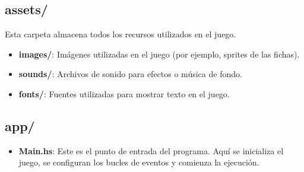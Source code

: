 \documentclass{article}
\begin{document}
\subsection{assets/}
Esta carpeta almacena todos los recursos utilizados en el juego.
\begin{itemize}
    \item \textbf{images/}: Imágenes utilizadas en el juego (por ejemplo, sprites de las fichas).
    \item \textbf{sounds/}: Archivos de sonido para efectos o música de fondo.
    \item \textbf{fonts/}: Fuentes utilizadas para mostrar texto en el juego.
\end{itemize}

\subsection{app/}
\begin{itemize}
    \item \textbf{Main.hs}: Este es el punto de entrada del programa. Aquí se inicializa el juego, se configuran los bucles de eventos y comienza la ejecución.
\end{itemize}
\end{document}

